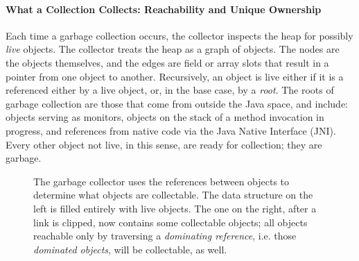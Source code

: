 \paragraph{What a Collection Collects: Reachability and Unique Ownership}
Each time a garbage collection occurs, the collector inspects the heap for
possibly \emph{live} objects. The collector treats the heap as a graph of
objects. The nodes are the objects themselves, and the edges are field or array
slots that result in a pointer from one object to another.  Recursively, an object is live either if it is a referenced
either by a live object, or, in the base case, by a \emph{root}. The roots of
garbage collection are those that come from outside the Java space, and include:
objects serving as monitors, objects on the stack of a method invocation in
progress, and references from native code via the Java Native Interface (JNI).
Every other object not live, in this sense, are ready for collection; they are
garbage.

\begin{figure}
\centering
	\hspace{0.18\textwidth}
	\caption{The garbage collector uses the references between objects to
	determine what objects are collectable. The data structure on the left is
	filled entirely with live objects. The one on the right, after a link is
	clipped, now contains some collectable objects; all objects reachable only by
	traversing a \emph{dominating reference}, i.e. those \emph{dominated objects},
	will be collectable, as well.}
	\label{fig:reachability}
\end{figure}

